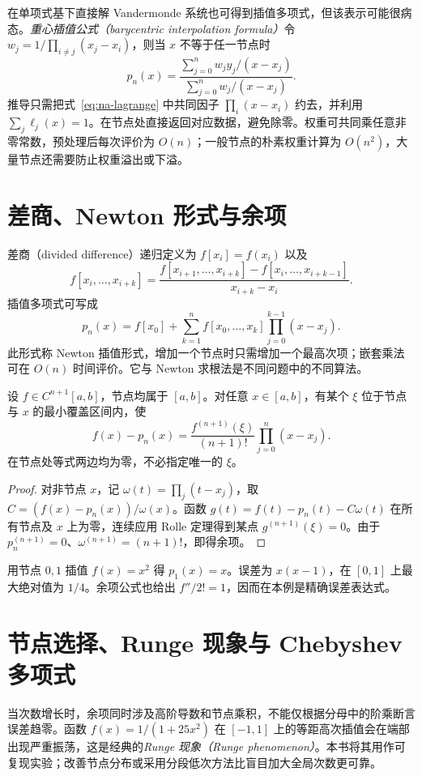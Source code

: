 \documentclass[UTF8,12pt,a4paper,fontset=fandol]{ctexbook}
\begin{document}
在单项式基下直接解 Vandermonde 系统也可得到插值多项式，但该表示可能很病态。\emph{重心插值公式（barycentric interpolation formula）}令 $w_j=1/\prod_{i\ne j}(x_j-x_i)$，则当 $x$ 不等于任一节点时
\begin{equation}
 p_n(x)=\frac{\sum_{j=0}^n w_jy_j/(x-x_j)}{\sum_{j=0}^n w_j/(x-x_j)}.
 \label{eq:na-barycentric}
\end{equation}
推导只需把式~\eqref{eq:na-lagrange} 中共同因子 $\prod_i(x-x_i)$ 约去，并利用 $\sum_j\ell_j(x)=1$。在节点处直接返回对应数据，避免除零。权重可共同乘任意非零常数，预处理后每次评价为 $O(n)$；一般节点的朴素权重计算为 $O(n^2)$，大量节点还需要防止权重溢出或下溢。

\section{差商、Newton 形式与余项}
差商（divided difference）递归定义为 $f[x_i]=f(x_i)$ 以及
\[
 f[x_i,\ldots,x_{i+k}]=
 \frac{f[x_{i+1},\ldots,x_{i+k}]-f[x_i,\ldots,x_{i+k-1}]}{x_{i+k}-x_i}.
\]
插值多项式可写成
\[
 p_n(x)=f[x_0]+\sum_{k=1}^nf[x_0,\ldots,x_k]\prod_{j=0}^{k-1}(x-x_j).
\]
此形式称 Newton 插值形式，增加一个节点时只需增加一个最高次项；嵌套乘法可在 $O(n)$ 时间评价。它与 Newton 求根法是不同问题中的不同算法。

\begin{theorem}[插值余项]
\label{thm:na-interpolation-error}
设 $f\in C^{n+1}[a,b]$，节点均属于 $[a,b]$。对任意 $x\in[a,b]$，有某个 $\xi$ 位于节点与 $x$ 的最小覆盖区间内，使
\begin{equation}
 f(x)-p_n(x)=\frac{f^{(n+1)}(\xi)}{(n+1)!}\prod_{j=0}^n(x-x_j).
 \label{eq:na-interpolation-error}
\end{equation}
在节点处等式两边均为零，不必指定唯一的 $\xi$。
\end{theorem}
\begin{proof}
对非节点 $x$，记 $\omega(t)=\prod_j(t-x_j)$，取 $C=(f(x)-p_n(x))/\omega(x)$。函数 $g(t)=f(t)-p_n(t)-C\omega(t)$ 在所有节点及 $x$ 上为零，连续应用 Rolle 定理得到某点 $g^{(n+1)}(\xi)=0$。由于 $p_n^{(n+1)}=0$、$\omega^{(n+1)}=(n+1)!$，即得余项。
\end{proof}

\begin{example}[二次函数的线性插值]
用节点 $0,1$ 插值 $f(x)=x^2$ 得 $p_1(x)=x$。误差为 $x(x-1)$，在 $[0,1]$ 上最大绝对值为 $1/4$。余项公式也给出 $f''/2!=1$，因而在本例是精确误差表达式。
\end{example}

\section{节点选择、Runge 现象与 Chebyshev 多项式}
\label{sec:na-chebyshev}
当次数增长时，余项同时涉及高阶导数和节点乘积，不能仅根据分母中的阶乘断言误差趋零。函数 $f(x)=1/(1+25x^2)$ 在 $[-1,1]$ 上的等距高次插值会在端部出现严重振荡，这是经典的\emph{Runge 现象（Runge phenomenon）}。本书将其用作可复现实验；改善节点分布或采用分段低次方法比盲目加大全局次数更可靠。
\end{document}
